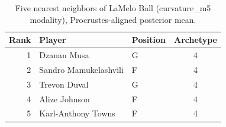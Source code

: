\begin{table}[htbp]
  \centering\small
  \begin{tabular}{rllc}
    \toprule
    Rank & Player & Position & Archetype \\
    \midrule
    1 & Dzanan Musa & G & 4 \\
    2 & Sandro Mamukelashvili & F & 4 \\
    3 & Trevon Duval & G & 4 \\
    4 & Alize Johnson & F & 4 \\
    5 & Karl-Anthony Towns & F & 4 \\
    \bottomrule
  \end{tabular}
  \caption{Five nearest neighbors of LaMelo Ball (curvature_m5 modality), Procrustes-aligned posterior mean.}
  \label{tab:LaMelo_Ball_neighbors_curvature_m5}
\end{table}

